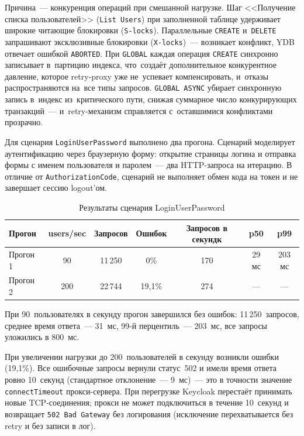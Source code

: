 \documentclass[times]{itmo-student-thesis}
\begin{document}
Причина~--- конкуренция операций при смешанной нагрузке.
Шаг <<Получение списка пользователей>> (\texttt{List Users})
при заполненной таблице удерживает широкие читающие блокировки (\texttt{S-locks}).
Параллельные \texttt{CREATE} и~\texttt{DELETE} запрашивают
эксклюзивные блокировки (\texttt{X-locks})~--- возникает конфликт,
YDB отвечает ошибкой \texttt{ABORTED}.
При \texttt{GLOBAL} каждая операция \texttt{CREATE} синхронно записывает
в~партицию индекса, что~создаёт дополнительное конкурентное давление,
которое retry-proxy уже не~успевает компенсировать, и~отказы
распространяются на~все типы запросов.
\texttt{GLOBAL ASYNC} убирает синхронную запись в~индекс из~критического пути,
снижая суммарное число конкурирующих транзакций~--- и~retry-механизм
справляется с~оставшимися конфликтами прозрачно.

Для сценария \texttt{LoginUserPassword} выполнено два прогона.
Сценарий моделирует аутентификацию через браузерную форму: открытие страницы логина
и отправка формы с именем пользователя и паролем~--- два HTTP-запроса на итерацию.
В отличие от \texttt{AuthorizationCode}, сценарий не выполняет обмен кода на токен
и не завершает сессию logout'ом.

\begin{table}[H]
\centering
\begin{tabular}{|l|c|c|c|c|c|c|}
\hline
\textbf{Прогон} & \textbf{users/sec} & \textbf{Запросов} & \textbf{Ошибок} & \textbf{Запросов в секундк} & \textbf{p50} & \textbf{p99} \\
\hline
Прогон 1  & 90  & 11\,250 & 0\%      & 170  & 29 мс  & 203 мс \\
Прогон 2  & 200 & 22\,744 & 19{,}1\% & 274  & ---    & --- \\
\hline
\end{tabular}
\caption{Результаты сценария LoginUserPassword}
\label{tab:load-login-password}
\end{table}

При 90~пользователях в секунду прогон завершился без ошибок: 11\,250~запросов,
среднее время ответа~--- 31~мс, 99-й перцентиль~--- 203~мс, все запросы уложились в 800~мс.

При увеличении нагрузки до 200~пользователей в секунду возникли ошибки (19{,}1\%).
Все ошибочные запросы вернули статус~502 и имели время ответа ровно 10~секунд
(стандартное отклонение~--- 9~мс)~--- это в точности значение \texttt{connectTimeout}
прокси-сервера.
При перегрузке Keycloak перестаёт принимать новые TCP-соединения;
прокси не может подключиться в течение 10~секунд и возвращает \texttt{502 Bad Gateway}
без логирования (исключение перехватывается без retry и без записи в лог).
\end{document}
